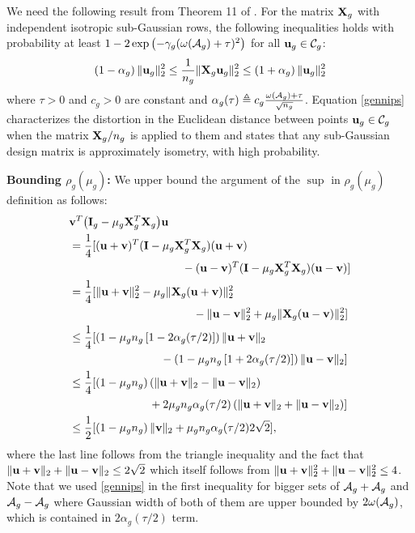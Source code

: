 \begin{IEEEproof}
	We need the following result from Theorem 11 of \cite{banerjee14}. For the matrix $\mathbf{X}_g$ with independent isotropic sub-Gaussian rows, the following inequalities holds with probability at least $1 - 2\exp\left( -\gamma_g (\omega(\cA_g) + \tau)^2  \right)$ for all $\u_g \in \cC_g$:
	\begin{align} 
	\label{gennips}
	\left(1 -  \alpha_g \right) \norm{\u_g}{2}^2  \leq \frac{1}{n_g}\norm{\X_g\u_g}{2}^2 \leq \left(1 + \alpha_g \right) \norm{\u_g}{2}^2
	\end{align}
	where $\tau > 0$ and $c_g > 0$ are constant and $\alpha_g(\tau) \triangleq c_g\frac{\omega(\cA_g) + \tau}{\sqrt{n_g}}$. %
	Equation \eqref{gennips} characterizes the distortion in the Euclidean distance between points $\u_g \in \cC_g$ when the matrix $\mathbf{X}_g/n_g$ is applied to them and states that any sub-Gaussian design matrix is approximately isometry, with high probability.

	\noindent	\textbf{Bounding $\rho_g(\mu_g)$:}		
		We upper bound the argument of the $\sup$ in $\rho_g(\mu_g)$ definition as follows:	
		\begin{align}
		\nr 
		&\v^T \big(\I_g - \mu_g \X_g^T \X_g\big) \u 
		\\ \nr 
		&=\frac{1}{4}[(\u + \v)^T(\I - \mu_g \X_g^T \X_g) (\u + \v) 		
		\\ \nr 
		&\hspace*{100pt}- (\u - \v)^T(\I - \mu_g \X_g^T \X_g) (\u - \v) ]
		\\ \nr 
		&=\frac{1}{4}[\norm{\u + \v}{2}^2 - \mu_g \norm{\X_g(\u + \v)}{2}^2 
		\\ \nr 
		&\hspace*{110pt}- \norm{\u - \v}{2}^2 + \mu_g \norm{\X_g(\u - \v)}{2}^2 ] \\ \nr 
		&\leq \frac{1}{4}[\left(1 - \mu_g n_g \left[1 -  2\alpha_g(\tau/2)\right]\right) \norm{\u + \v}{2} 
		\\ \nr 
		&\hspace*{81pt}- \left(1 - \mu_g n_g \left[1 +  2 \alpha_g(\tau/2)\right]\right) \norm{\u - \v}{2} ]
		\\ \nr 
		&\leq \frac{1}{4}[\left(1 - \mu_g n_g \right) \left(\norm{\u + \v}{2}  - \norm{\u - \v}{2} \right) 
		\\ \nr 
		&\hspace*{71pt}+   2\mu_g n_g \alpha_g(\tau/2) \left(\norm{\u + \v}{2} + \norm{\u - \v}{2} \right) ]\\ \nr 
		&\leq \frac{1}{2}[\left(1 - \mu_g n_g \right) \norm{\v}{2} +   \mu_g n_g \alpha_g(\tau/2) 2\sqrt{2} ],
		\end{align}		
		where the last line follows from the triangle inequality and the fact that $\|\mathbf{u} + \mathbf{v}\|_{2} + \|\mathbf{u} - \mathbf{v}\|_{2} \leq 2\sqrt{2}$ which itself follows from $\|\mathbf{u} + \mathbf{v}\|_{2}^2 + \|\mathbf{u} - \mathbf{v}\|_{2}^2 \leq 4$.
		Note that we used \eqref{gennips} in the first inequality for bigger sets of $\cA_g + \cA_g$ and $\cA_g - \cA_g$ where Gaussian width of both of them are upper bounded by $2\omega(\cA_g)$, which is contained in $2\alpha_g(\tau/2)$ term.
		

\end{IEEEproof}
